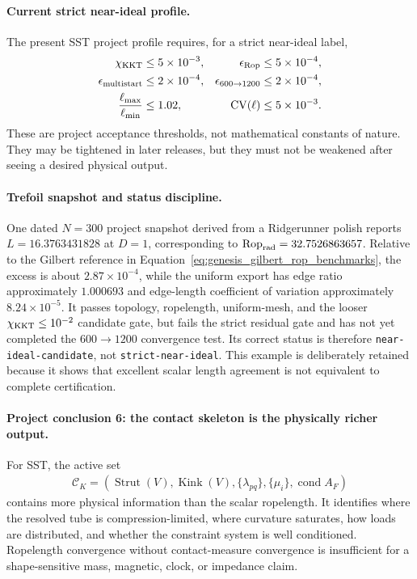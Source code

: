 \documentclass[11pt]{article}
\theoremstyle{definition}
\theoremstyle{plain}
\theoremstyle{remark}
\begin{document}
\paragraph{Current strict near-ideal profile.}
The present SST project profile requires, for a strict near-ideal label,
\begin{align}
    \chi_{\rm KKT}&\le5\times10^{-3},
    &
    \epsilon_{\rm Rop}&\le5\times10^{-4},
    \\
    \epsilon_{\rm multistart}&\le2\times10^{-4},
    &
    \epsilon_{600\rightarrow1200}&\le2\times10^{-4},
    \\
    \frac{\ell_{\max}}{\ell_{\min}}&\le1.02,
    &
    \operatorname{CV}(\ell)&\le5\times10^{-3}.
    \label{eq:genesis_strict_near_ideal_profile}
\end{align}
These are project acceptance thresholds, not mathematical constants of nature.
They may be tightened in later releases, but they must not be weakened after
seeing a desired physical output.

\paragraph{Trefoil snapshot and status discipline.}
One dated $N=300$ project snapshot derived from a Ridgerunner polish reports
$L=16.3763431828$ at $D=1$, corresponding to
$\operatorname{Rop}_{\rm rad}=32.7526863657$.  Relative to the Gilbert reference
in Equation~\eqref{eq:genesis_gilbert_rop_benchmarks}, the excess is about
$2.87\times10^{-4}$, while the uniform export has edge ratio approximately
$1.000693$ and edge-length coefficient of variation approximately
$8.24\times10^{-5}$.  It passes topology, ropelength, uniform-mesh, and the
looser $\chi_{\rm KKT}\le10^{-2}$ candidate gate, but fails the strict residual
gate and has not yet completed the $600\rightarrow1200$ convergence test.
Its correct status is therefore \texttt{near-ideal-candidate}, not
\texttt{strict-near-ideal}.  This example is deliberately retained because it
shows that excellent scalar length agreement is not equivalent to complete
certification.

\paragraph{Project conclusion 6: the contact skeleton is the physically richer output.}
For SST, the active set
\begin{align}
    \mathcal C_K
    =
    \left(
        \operatorname{Strut}(V),
        \operatorname{Kink}(V),
        \{\lambda_{pq}\},
        \{\mu_i\},
        \operatorname{cond}A_F
    \right)
    \label{eq:genesis_contact_skeleton}
\end{align}
contains more physical information than the scalar ropelength.  It identifies
where the resolved tube is compression-limited, where curvature saturates, how
loads are distributed, and whether the constraint system is well conditioned.
Ropelength convergence without contact-measure convergence is insufficient for
a shape-sensitive mass, magnetic, clock, or impedance claim.
\end{document}
